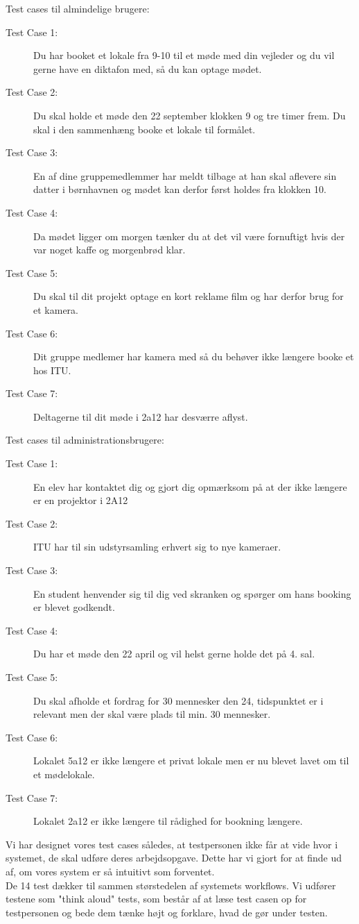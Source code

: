 Test cases til almindelige brugere:
\begin{description}
\item[Test Case 1:] Du har booket et lokale fra 9-10 til et møde med din vejleder og du vil gerne have en diktafon med, så du kan optage mødet.
\item[Test Case 2:] Du skal holde et møde den 22 september klokken 9 og tre timer frem. Du skal i den sammenhæng booke et lokale til formålet.
\item[Test Case 3:] En af dine gruppemedlemmer har meldt tilbage at han skal aflevere sin datter i børnhavnen og mødet kan derfor først holdes fra klokken 10.
\item[Test Case 4:] Da mødet ligger om morgen tænker du at det vil være fornuftigt hvis der var noget kaffe og morgenbrød klar.
\item[Test Case 5:] Du skal til dit projekt optage en kort reklame film og har derfor brug for et kamera.
\item[Test Case 6:] Dit gruppe medlemer har kamera med så du behøver ikke længere booke et hos ITU.
\item[Test Case 7:] Deltagerne til dit møde i 2a12 har desværre aflyst.
\end{description}
Test cases til administrationsbrugere:
\begin{description}
\item[Test Case 1:] En elev har kontaktet dig og gjort dig opmærksom på at der ikke længere er en projektor i 2A12
\item[Test Case 2:] ITU har til sin udstyrsamling erhvert sig to nye kameraer.
\item[Test Case 3:] En student henvender sig til dig ved skranken og spørger om hans booking er blevet godkendt.
\item[Test Case 4:] Du har et møde den 22 april og vil helst gerne holde det på 4. sal.
\item[Test Case 5:] Du skal afholde et fordrag for 30 mennesker den 24, tidspunktet er i relevant men der skal være plads til min. 30 mennesker.
\item[Test Case 6:] Lokalet 5a12 er ikke længere et privat lokale men er nu blevet lavet om til et mødelokale.
\item[Test Case 7:] Lokalet 2a12 er ikke længere til rådighed for bookning længere.
\end{description}

Vi har designet vores test cases således, at testpersonen ikke får at vide hvor i systemet, de skal udføre deres arbejdsopgave. Dette har vi gjort for at finde ud af, om vores system er så intuitivt som forventet.
\\De 14 test dækker til sammen størstedelen af systemets workflows. Vi udfører testene som "think aloud" tests\cite[421]{SL_UID}, som består af at læse test casen op for testpersonen og bede dem tænke højt og forklare, hvad de gør under testen.

